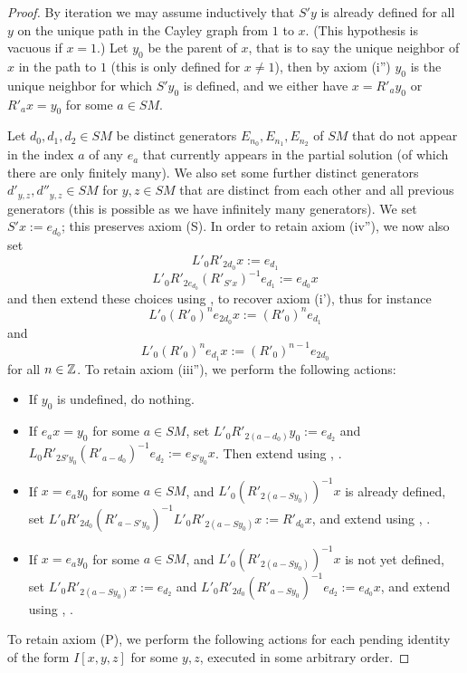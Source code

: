 \begin{proof} By iteration we may assume inductively that $S'y$ is already defined for all $y$ on the unique path in the Cayley graph from $1$ to $x$.  (This hypothesis is vacuous if $x=1$.)  Let $y_0$ be the parent of $x$, that is to say the unique neighbor of $x$ in the path to $1$ (this is only defined for $x \neq 1$), then by axiom (i'') $y_0$ is the unique neighbor for which $S'y_0$ is defined, and we either have $x = R'_a y_0$ or $R'_a x = y_0$ for some $a \in SM$.

Let $d_0, d_1, d_2 \in SM$ be distinct generators $E_{n_0}, E_{n_1}, E_{n_2}$ of $SM$ that do not appear in the index $a$ of any $e_a$ that currently appears in the partial solution (of which there are only finitely many).  We also set some further distinct generators $d'_{y,z}, d''_{y,z} \in SM$ for $y,z \in SM$ that are distinct from each other and all previous generators (this is possible as we have infinitely many generators).  We set $S'x := e_{d_0}$; this preserves axiom (S).  In order to retain axiom (iv''), we now also set
$$ L'_0 R'_{2d_0} x := e_{d_1}$$
$$ L'_0 R'_{2e_{d_0}} (R'_{S'x})^{-1} e_{d_1} := e_{d_0} x$$
and then extend these choices using ,  to recover axiom (i'), thus for instance
$$ L'_0 (R'_0)^n e_{2d_0} x := (R'_0)^n e_{d_1}$$
and
$$ L'_0 (R'_0)^n e_{d_1} x := (R'_0)^{n-1} e_{2d_0}$$
for all $n \in \mathbb{Z}$.  To retain axiom (iii''), we perform the following actions:
\begin{itemize}
\item If $y_0$ is undefined, do nothing.
\item If $e_a x = y_0$ for some $a \in SM$, set $L'_0 R'_{2(a-d_0)} y_0 := e_{d_2}$ and $L_0 R'_{2S'y_0} (R'_{a-d_0})^{-1} e_{d_2} := e_{S'y_0} x$.  Then extend using , .
\item If $x = e_a y_0$ for some $a \in SM$, and $L'_0 (R'_{2(a-Sy_0)})^{-1} x$ is already defined, set $L'_0 R'_{2d_0} (R'_{a-S'y_0})^{-1} L'_0 R'_{2(a-Sy_0)} x :=R'_{d_0}x$, and extend using , .
\item If $x = e_a y_0$ for some $a \in SM$, and $L'_0 (R'_{2(a-Sy_0)})^{-1} x$ is not yet defined, set $L'_0 R'_{2(a-Sy_0)} x := e_{d_2}$ and $L'_0 R'_{2d_0} (R'_{a-Sy_0})^{-1} e_{d_2} := e_{d_0} x$, and extend using , .
\end{itemize}
To retain axiom (P), we perform the following actions for each pending identity of the form $I[x,y,z]$ for some $y,z$, executed in some arbitrary order.

\end{proof}
